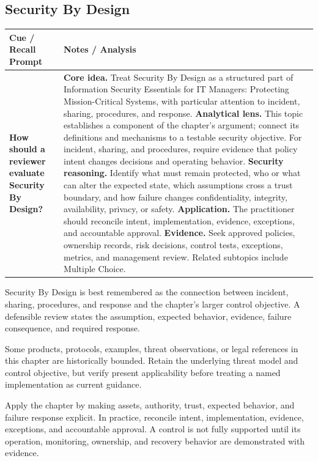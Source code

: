 \documentclass[11pt]{article}
\newcommand{\CornellHeader}{%
\rowcolor{Navy}\color{white}\bfseries Cue / Recall Prompt & \color{white}\bfseries Notes / Analysis\\\hline}
\newcommand{\CornellRow}[2]{%
\cellcolor{CueGray}\RaggedRight\textbf{#1} & \RaggedRight #2\\\hline}
\begin{document}
\subsection*{Security By Design}
\begin{longtable}{>{\RaggedRight\arraybackslash}p{}|>{\RaggedRight\arraybackslash}p{}}
\CornellHeader
\CornellRow{How should a reviewer evaluate Security By Design?}{\textbf{Core idea.} Treat Security By Design as a structured part of Information Security Essentials for IT Managers: Protecting Mission-Critical Systems, with particular attention to incident, sharing, procedures, and response. \textbf{Analytical lens.} This topic establishes a component of the chapter's argument; connect its definitions and mechanisms to a testable security objective. For incident, sharing, and procedures, require evidence that policy intent changes decisions and operating behavior. \textbf{Security reasoning.} Identify what must remain protected, who or what can alter the expected state, which assumptions cross a trust boundary, and how failure changes confidentiality, integrity, availability, privacy, or safety. \textbf{Application.} The practitioner should reconcile intent, implementation, evidence, exceptions, and accountable approval. \textbf{Evidence.} Seek approved policies, ownership records, risk decisions, control tests, exceptions, metrics, and management review. Related subtopics include Multiple Choice.}
\end{longtable}
\begin{topicsummary}
Security By Design is best remembered as the connection between incident, sharing, procedures, and response and the chapter's larger control objective. A defensible review states the assumption, expected behavior, evidence, failure consequence, and required response.
\end{topicsummary}
\begin{historybox}
Some products, protocols, examples, threat observations, or legal references in this chapter are historically bounded. Retain the underlying threat model and control objective, but verify present applicability before treating a named implementation as current guidance.
\end{historybox}
\begin{defensebox}
Apply the chapter by making assets, authority, trust, expected behavior, and failure response explicit. In practice, reconcile intent, implementation, evidence, exceptions, and accountable approval. A control is not fully supported until its operation, monitoring, ownership, and recovery behavior are demonstrated with evidence.
\end{defensebox}
\end{document}
